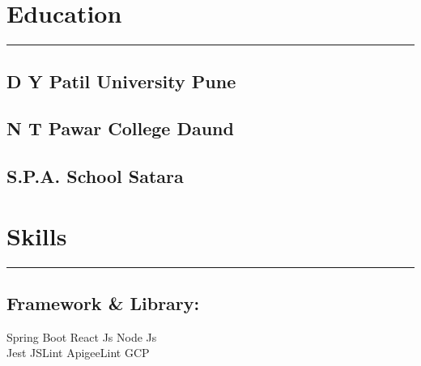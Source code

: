 \documentclass[]{deedy-resume-reversed}
\newcommand{\mysection}[2]{%
    \section{#1\hspace{0.5em}#2}
}
\begin{document}
\begin{minipage}[t]{0.60\textwidth}

% 
% 

%
%

\end{minipage}
\hfill
\begin{minipage}[t]{0.33\textwidth}


\mysection{\faUniversity}{Education}
\rule{\textwidth}{0.4pt}
\subsection{D Y Patil University Pune}
\sectionsep

\subsection{ N T Pawar College Daund}
\sectionsep

\subsection{S.P.A. School Satara}
\sectionsep


\mysection{\faCogs}{Skills}
\rule{\textwidth}{0.4pt}
\subsection{Framework \& Library:}
 \textbullet{} Spring Boot \textbullet{} React Js \textbullet{} Node Js \\\textbullet{} Jest \textbullet{} JSLint \textbullet{} ApigeeLint \textbullet{} GCP\\
\sectionsep

\end{minipage}
\end{document}
